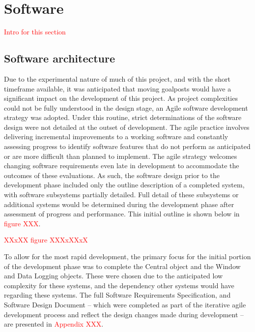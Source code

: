 \documentclass[main.tex]{subfiles}
\begin{document}
\section{Software}
\textcolor{red}{Intro for this section}

\subsection{Software architecture}
Due to the experimental nature of much of this project, and with the short timeframe available, it was anticipated that moving goalposts would have a significant impact on the development of this project. As project complexities could not be fully understood in the design stage, an Agile software development strategy was adopted. Under this routine, strict determinations of the software design were not detailed at the outset of development. The agile practice involves delivering incremental improvements to a working software and constantly assessing progress to identify software features that do not perform as anticipated or are more difficult than planned to implement. The agile strategy welcomes changing software requirements even late in development to accommodate the outcomes of these evaluations.
As such, the software design prior to the development phase included only the outline description of a completed system, with software subsystems partially detailed. Full detail of these subsystems or additional systems would be determined during the development phase after assessment of progress and performance. This initial outline is shown below in \textcolor{red}{figure XXX}.

\textcolor{red}{XXxXX figure XXXxXXxX}

To allow for the most rapid development, the primary focus for the initial portion of the development phase was to complete the Central object and the Window and Data Logging objects. These were chosen due to the anticipated low complexity for these systems, and the dependency other systems would have regarding these systems. The full Software Requirements Specification, and Software Design Document – which were completed as part of the iterative agile development process and reflect the design changes made during development – are presented in \textcolor{red}{Appendix XXX}.
\end{document}
